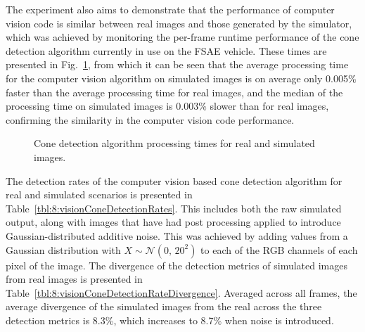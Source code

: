 The experiment also aims to demonstrate that the performance of computer vision code is similar between real images and those generated by the simulator, which was achieved by monitoring the per-frame runtime performance of the cone detection algorithm currently in use on the FSAE vehicle.
These times are presented in Fig.~\ref{fig:8:coneDetectionProcessingTimes}, from which it can be seen that the average processing time for the computer vision algorithm on simulated images is on average only 0.005\% faster than the average processing time for real images, and the median of the processing time on simulated images is 0.003\% slower than for real images, confirming the similarity in the computer vision code performance.

\begin{figure}[!ht] %
	\centering
	
	\caption{Cone detection algorithm processing times for real and simulated images.}
	\label{fig:8:coneDetectionProcessingTimes}
\end{figure}

The detection rates of the computer vision based cone detection algorithm for real and simulated scenarios is presented in Table~\ref{tbl:8:visionConeDetectionRates}.
This includes both the raw simulated output, along with images that have had post processing applied to introduce Gaussian-distributed additive noise.
This was achieved by adding values from a Gaussian distribution with $X \sim \mathcal{N}(0,\,20^{2})$ to each of the RGB channels of each pixel of the image.
The divergence of the detection metrics of simulated images from real images is presented in Table~\ref{tbl:8:visionConeDetectionRateDivergence}.
Averaged across all frames, the average divergence of the simulated images from the real across the three detection metrics is 8.3\%, which increases to 8.7\% when noise is introduced.


